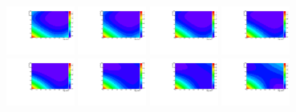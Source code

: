 \begin{figure}[h]
  \centering
\includegraphics[width=0.2\textwidth]{figures/sec-background/correlation/res_th2F_exp_th2f_res_alpha_00_n005.pdf}
\includegraphics[width=0.2\textwidth]{figures/sec-background/correlation/res_th2F_exp_th2f_res_alpha_01_n005.pdf}
\includegraphics[width=0.2\textwidth]{figures/sec-background/correlation/res_th2F_exp_th2f_res_alpha_02_n005.pdf}
\includegraphics[width=0.2\textwidth]{figures/sec-background/correlation/res_th2F_exp_th2f_res_alpha_03_n005.pdf}
\includegraphics[width=0.2\textwidth]{figures/sec-background/correlation/res_th2F_exp_th2f_res_alpha_04_n005.pdf}
\includegraphics[width=0.2\textwidth]{figures/sec-background/correlation/res_th2F_exp_th2f_res_alpha_05_n005.pdf}
\includegraphics[width=0.2\textwidth]{figures/sec-background/correlation/res_th2F_exp_th2f_res_alpha_06_n005.pdf}
\includegraphics[width=0.2\textwidth]{figures/sec-background/correlation/res_th2F_exp_th2f_res_alpha_07_n005.pdf}

\end{figure}
